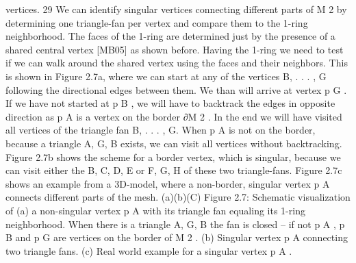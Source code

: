 \documentclass[openany]{book}
\begin{document}
vertices. 29 We can identify singular vertices connecting different parts of M 
2 by determining one triangle-fan per vertex and compare them to the 1-ring 
neighborhood. The faces of the 1-ring are determined just by the presence of a 
shared central vertex [MB05] as shown before. Having the 1-ring we need to test 
if we can walk around the shared vertex using the faces and their neighbors. 
This is shown in Figure 2.7a, where we can start at any of the vertices 
{B, . . . , G} following the directional edges between them. We than will 
arrive at vertex p G . If we have not started at p B , we will have to 
backtrack the edges in opposite direction as p A is a vertex on the border 
∂M 2 . In the end we will have visited all vertices of the triangle fan 
{B, . . . , G}. When p A is not on the border, because a triangle {A, G, B} 
exists, we can visit all vertices without backtracking. Figure 2.7b shows the 
scheme for a border vertex, which is singular, because we can visit either the 
{B, C, D, E} or {F, G, H} of these two triangle-fans. Figure 2.7c shows an 
example from a 3D-model, where a non-border, singular vertex p A connects 
different parts of the mesh.
(a)(b)(C)
Figure 2.7: Schematic visualization of (a) a non-singular vertex p A with its 
triangle fan equaling its 1-ring neighborhood. When there is a triangle 
{A, G, B} the fan is closed – if not p A , p B and p G are vertices on the 
border of M 2 . (b) Singular vertex p A connecting two triangle fans.
(c) Real world example for a singular vertex p A .~\cite[p.~29]{Mara12}
\end{document}
